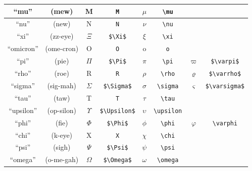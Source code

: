 \documentclass[final,10pt,letterpaper,landscape]{article}
\begin{document}
{\begin{tabular}{c | c || c | c || c | c | c | c}
    \hline
    \hline
    ``mu''      & (mew)       & M             & \texttt{M}           & $\mu$      & \verb#\mu#      & & \\
    \hline
    \hline
    ``nu''      & (new)       & N             & \texttt{N}           & $\nu$      & \verb#\nu#      & & \\
    \hline
    \hline
    ``xi''      & (zz-eye)    & $\Xi$         & \verb#$\Xi$#         & $\xi$      & \verb#\xi#      & & \\
    \hline
    \hline
    ``omicron'' & (ome-cron)  & O             & \texttt{O}           & o          & \texttt{o}      & & \\
    \hline
    \hline
    ``pi''      & (pie)       & $\Pi$         & \verb#$\Pi$#         & $\pi$      & \verb#\pi#      & $\varpi$      & \verb#$\varpi$#    \\
    \hline
    \hline
    ``rho''     & (roe)       & R             & \texttt{R}           & $\rho$     & \verb#\rho#     & $\varrho$     & \verb#$\varrho$#   \\
    \hline
    \hline
    ``sigma''   & (sig-mah)   & $\Sigma$      & \verb#$\Sigma$#      & $\sigma$   & \verb#\sigma#   & $\varsigma$   & \verb#$\varsigma$# \\
    \hline
    \hline
    ``tau''     & (taw)       & T             & \texttt{T}           & $\tau$     & \verb#\tau#     & & \\
    \hline
    \hline
    ``upsilon'' & (op-silon)  & $\Upsilon$    & \verb#$\Upsilon$#    & $\upsilon$ & \verb#\upsilon# & & \\
    \hline
    \hline
    ``phi''     & (fie)       & $\Phi$        & \verb#$\Phi$#        & $\phi$     & \verb#\phi#     & $\varphi$     & \verb#\varphi#     \\
    \hline
    \hline
    ``chi''     & (k-eye)     & X             & \texttt{X}           & $\chi$     & \verb#\chi#     & & \\
    \hline
    \hline
    ``psi''     & (sigh)      & $\Psi$        & \verb#$\Psi$#        & $\psi$     & \verb#\psi#     & & \\
    \hline
    \hline
    ``omega''   & (o-me-gah)  & $\Omega$      & \verb#$\Omega$#      & $\omega$   & \verb#\omega#   & &
  \end{tabular}
}
\end{document}
